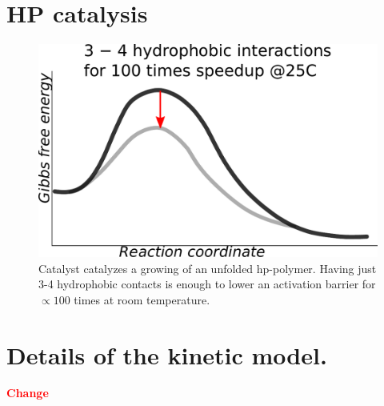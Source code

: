 \documentclass[journal=jacsat,manuscript=article,layout=twocolumn]{achemso}
\newcommand*{\red}[1]{\textcolor{red}{#1}}
\begin{document}
\section{HP catalysis}
\begin{figure}[h!]
  \centering
  \includegraphics[width=0.9\columnwidth]{pictures/hp-catalysis-b.pdf} 
  \caption{Catalyst catalyzes a growing of an unfolded hp-polymer. 
           Having just 3-4 hydrophobic contacts is enough to lower an 
           activation barrier for $\propto 100$ times at room 
           temperature.}
  \label{fig:hp-catalysis-b}
\end{figure}

\section{Details of the kinetic model.}
\red{\textbf{Change}}
\end{document}
